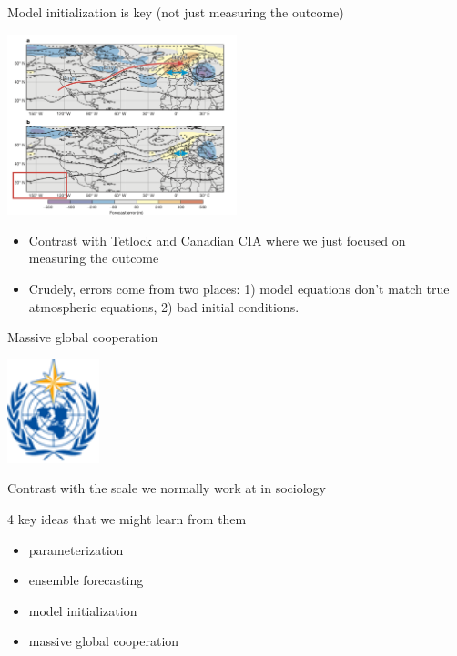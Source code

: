 \documentclass[aspectratio=169]{beamer}
\begin{document}
\begin{frame}

Model initialization is key (not just measuring the outcome)
\begin{center}
\includegraphics[width = 0.5\textwidth]{figures/bauer_quiet_2015_box1}
\end{center}

\vfill
\begin{itemize}
\item Contrast with Tetlock and Canadian CIA where we just focused on measuring the outcome
\pause
\item Crudely, errors come from two places: 1) model equations don't match true atmospheric equations, 2) bad initial conditions.
\end{itemize}

\end{frame}
\begin{frame}

Massive global cooperation
\begin{center}
\includegraphics[width = 0.2\textwidth]{figures/wmo_logo}
\end{center}

\vfill
Contrast with the scale we normally work at in sociology

\end{frame}
\begin{frame}

4 key ideas that we might learn from them
\begin{itemize}
\item parameterization
\item ensemble forecasting
\item model initialization
\item massive global cooperation
\end{itemize}

\end{frame}
\end{document}
